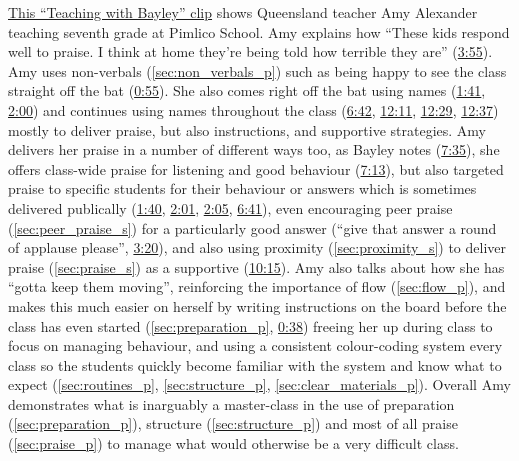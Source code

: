 \documentclass[12pt]{report}
\begin{document}
\begin{appendices}
\href{https://www.youtube.com/watch?v=KkXRjrSsMQg}{This ``Teaching with Bayley'' clip} shows Queensland teacher Amy Alexander teaching seventh grade at Pimlico School. Amy explains how ``These kids respond well to praise. I think at home they're being told how terrible they are'' (\href{https://www.youtube.com/watch?v=KkXRjrSsMQg&t=235}{3:55}). Amy uses non-verbals (\ref{sec:non_verbals_p}) such as being happy to see the class straight off the bat (\href{https://www.youtube.com/watch?v=KkXRjrSsMQg&t=55}{0:55}). She also comes right off the bat using names (\href{https://www.youtube.com/watch?v=KkXRjrSsMQg&t=101}{1:41}, \href{https://www.youtube.com/watch?v=KkXRjrSsMQg&t=120}{2:00}) and continues using names throughout the class (\href{https://www.youtube.com/watch?v=KkXRjrSsMQg&t=402}{6:42}, \href{https://www.youtube.com/watch?v=KkXRjrSsMQg&t=731}{12:11}, \href{https://www.youtube.com/watch?v=KkXRjrSsMQg&t=749}{12:29}, \href{https://www.youtube.com/watch?v=KkXRjrSsMQg&t=757}{12:37}) mostly to deliver praise, but also instructions, and supportive strategies. Amy delivers her praise in a number of different ways too, as Bayley notes (\href{https://www.youtube.com/watch?v=KkXRjrSsMQg&t=455}{7:35}), she offers class-wide praise for listening and good behaviour (\href{https://www.youtube.com/watch?v=KkXRjrSsMQg&t=433}{7:13}), but also targeted praise to specific students for their behaviour or answers which is sometimes delivered publically (\href{https://www.youtube.com/watch?v=KkXRjrSsMQg&t=100}{1:40}, \href{https://www.youtube.com/watch?v=KkXRjrSsMQg&t=121}{2:01}, \href{https://www.youtube.com/watch?v=KkXRjrSsMQg&t=125}{2:05}, \href{https://www.youtube.com/watch?v=KkXRjrSsMQg&t=401}{6:41}), even encouraging peer praise (\ref{sec:peer_praise_s}) for a particularly good answer (``give that answer a round of applause please'', \href{https://www.youtube.com/watch?v=KkXRjrSsMQg&t=200}{3:20}), and also using proximity (\ref{sec:proximity_s}) to deliver praise (\ref{sec:praise_s}) as a supportive (\href{https://www.youtube.com/watch?v=KkXRjrSsMQg&t=615}{10:15}). Amy also talks about how she has ``gotta keep them moving'', reinforcing the importance of flow (\ref{sec:flow_p}), and makes this much easier on herself by writing instructions on the board before the class has even started (\ref{sec:preparation_p}, \href{https://www.youtube.com/watch?v=KkXRjrSsMQg&t=38}{0:38}) freeing her up during class to focus on managing behaviour, and using a consistent colour-coding system every class so the students quickly become familiar with the system and know what to expect (\ref{sec:routines_p}, \ref{sec:structure_p}, \ref{sec:clear_materials_p}). Overall Amy demonstrates what is inarguably a master-class in the use of preparation (\ref{sec:preparation_p}), structure (\ref{sec:structure_p}) and most of all praise (\ref{sec:praise_p}) to manage what would otherwise be a very difficult class. 




\end{appendices}
\end{document}
